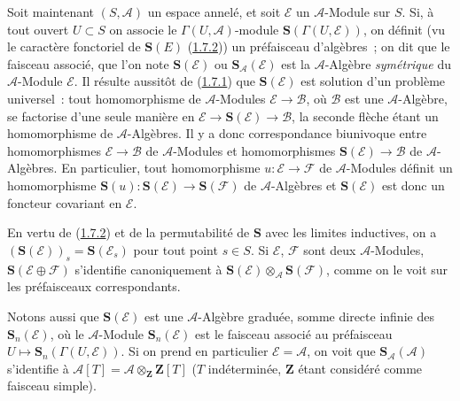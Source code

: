 \begin{env}[1.7.4]
\label{II.1.7.4-fr}
Soit maintenant $(S,\mathcal{A})$ un espace annelé, et soit $\mathcal{E}$ un
$\mathcal{A}$-Module sur $S$. Si, à tout ouvert $U\subset S$ on associe le
$\Gamma(U,\mathcal{A})$-module
$\mathbf{S}(\Gamma(U,\mathcal{E}))$, on définit (vu le caractère fonctoriel
de $\mathbf{S}(E)$ (\hyperref[II.1.7.2-fr]{1.7.2})) un préfaisceau d'algèbres~;
on dit que le faisceau associé, que l'on note $\mathbf{S}(\mathcal{E})$ ou
$\mathbf{S}_{\mathcal{A}}(\mathcal{E})$ est la $\mathcal{A}$-Algèbre
\emph{symétrique} du $\mathcal{A}$-Module $\mathcal{E}$. Il résulte aussitôt
de (\hyperref[II.1.7.1-fr]{1.7.1}) que $\mathbf{S}(\mathcal{E})$ est solution
d'un problème universel~: tout homomorphisme de $\mathcal{A}$-Modules
$\mathcal{E}\to\mathcal{B}$, où $\mathcal{B}$ est une $\mathcal{A}$-Algèbre,
se factorise d'une seule manière en
$\mathcal{E}\to\mathbf{S}(\mathcal{E})\to\mathcal{B}$, la seconde flèche étant
un homomorphisme de $\mathcal{A}$-Algèbres. Il y a donc correspondance
biunivoque entre homomorphismes $\mathcal{E}\to\mathcal{B}$ de
$\mathcal{A}$-Modules et homomorphismes
$\mathbf{S}(\mathcal{E})\to\mathcal{B}$ de $\mathcal{A}$-Algèbres. En
particulier, tout homomorphisme $u:\mathcal{E}\to\mathcal{F}$ de
$\mathcal{A}$-Modules définit un homomorphisme
$\mathbf{S}(u):\mathbf{S}(\mathcal{E})\to\mathbf{S}(\mathcal{F})$ de
$\mathcal{A}$-Algèbres et $\mathbf{S}(\mathcal{E})$ est donc un foncteur
covariant en $\mathcal{E}$.

En vertu de (\hyperref[II.1.7.2-fr]{1.7.2}) et de la permutabilité de
$\mathbf{S}$ avec les limites inductives, on a
$(\mathbf{S}(\mathcal{E}))_s=\mathbf{S}(\mathcal{E}_s)$ pour tout point
$s\in S$. Si $\mathcal{E}$, $\mathcal{F}$ sont deux $\mathcal{A}$-Modules,
$\mathbf{S}(\mathcal{E}\oplus\mathcal{F})$ s'identifie canoniquement à
$\mathbf{S}(\mathcal{E})\otimes_{\mathcal{A}}\mathbf{S}(\mathcal{F})$,
comme on le voit sur les préfaisceaux correspondants.

Notons aussi que $\mathbf{S}(\mathcal{E})$ est une $\mathcal{A}$-Algèbre
graduée, somme directe infinie des $\mathbf{S}_n(\mathcal{E})$, où le
$\mathcal{A}$-Module $\mathbf{S}_n(\mathcal{E})$ est le faisceau associé au
préfaisceau $U\mapsto\mathbf{S}_n(\Gamma(U,\mathcal{E}))$. Si on prend en
particulier $\mathcal{E}=\mathcal{A}$, on voit que
$\mathbf{S}_{\mathcal{A}}(\mathcal{A})$ s'identifie à
$\mathcal{A}[T]=\mathcal{A}\otimes_{\mathbf{Z}}\mathbf{Z}[T]$
($T$ indéterminée, $\mathbf{Z}$ étant considéré comme faisceau simple).
\end{env}

